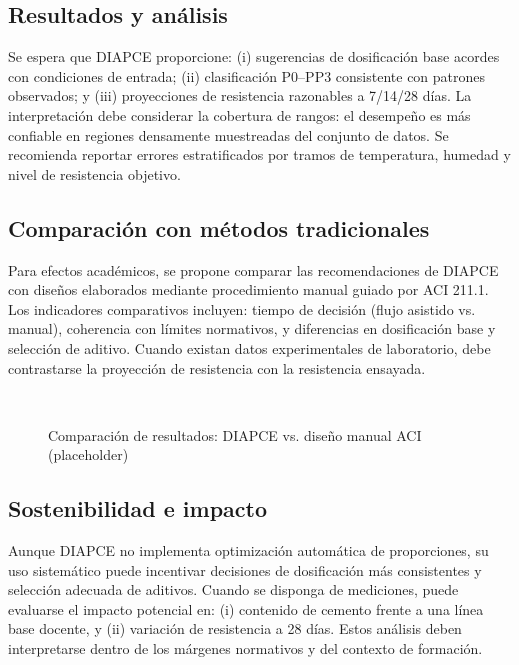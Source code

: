 \subsection{Resultados y análisis}
Se espera que DIAPCE proporcione: (i) sugerencias de dosificación base acordes con condiciones de entrada; (ii) clasificación P0–PP3 consistente con patrones observados; y (iii) proyecciones de resistencia razonables a 7/14/28 días. La interpretación debe considerar la cobertura de rangos: el desempeño es más confiable en regiones densamente muestreadas del conjunto de datos. Se recomienda reportar errores estratificados por tramos de temperatura, humedad y nivel de resistencia objetivo.

\subsection{Comparación con métodos tradicionales}
Para efectos académicos, se propone comparar las recomendaciones de DIAPCE con diseños elaborados mediante procedimiento manual guiado por ACI 211.1. Los indicadores comparativos incluyen: tiempo de decisión (flujo asistido vs. manual), coherencia con límites normativos, y diferencias en dosificación base y selección de aditivo. Cuando existan datos experimentales de laboratorio, debe contrastarse la proyección de resistencia con la resistencia ensayada.

\begin{figure}[H]
  \centering
  \fbox{\rule{0pt}{2in}\rule{0.9\linewidth}{0pt}}\\
  \caption{Comparación de resultados: DIAPCE vs. diseño manual ACI (placeholder)}
\end{figure}

\subsection{Sostenibilidad e impacto}
Aunque DIAPCE no implementa optimización automática de proporciones, su uso sistemático puede incentivar decisiones de dosificación más consistentes y selección adecuada de aditivos. Cuando se disponga de mediciones, puede evaluarse el impacto potencial en: (i) contenido de cemento frente a una línea base docente, y (ii) variación de resistencia a 28 días. Estos análisis deben interpretarse dentro de los márgenes normativos y del contexto de formación.

